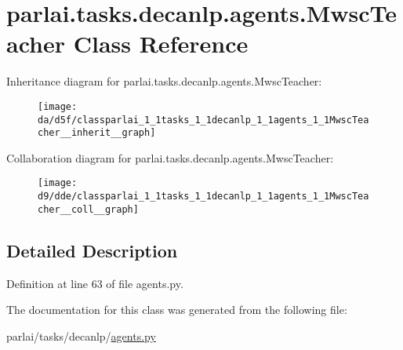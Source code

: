 \hypertarget{classparlai_1_1tasks_1_1decanlp_1_1agents_1_1MwscTeacher}{}\section{parlai.\+tasks.\+decanlp.\+agents.\+Mwsc\+Teacher Class Reference}
\label{classparlai_1_1tasks_1_1decanlp_1_1agents_1_1MwscTeacher}


Inheritance diagram for parlai.\+tasks.\+decanlp.\+agents.\+Mwsc\+Teacher\+:\nopagebreak
\begin{figure}[H]
\begin{center}
\leavevmode
\texttt{[image: da/d5f/classparlai\_1\_1tasks\_1\_1decanlp\_1\_1agents\_1\_1MwscTeacher\_\_inherit\_\_graph]}
\end{center}
\end{figure}


Collaboration diagram for parlai.\+tasks.\+decanlp.\+agents.\+Mwsc\+Teacher\+:\nopagebreak
\begin{figure}[H]
\begin{center}
\leavevmode
\texttt{[image: d9/dde/classparlai\_1\_1tasks\_1\_1decanlp\_1\_1agents\_1\_1MwscTeacher\_\_coll\_\_graph]}
\end{center}
\end{figure}


\subsection{Detailed Description}


Definition at line 63 of file agents.\+py.



The documentation for this class was generated from the following file\+:\begin{DoxyCompactItemize}
\item 
parlai/tasks/decanlp/\hyperlink{parlai_2tasks_2decanlp_2agents_8py}{agents.\+py}\end{DoxyCompactItemize}
